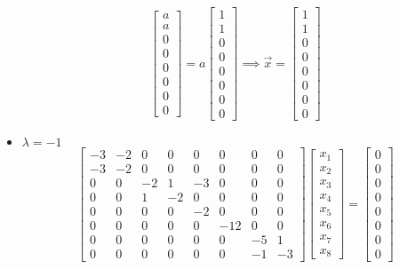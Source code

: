 \documentclass{report}
\begin{document}
\begin{itemize}
$$
\begin{bmatrix}
a \\ a \\ 0 \\ 0 \\ 0 \\ 0 \\ 0 \\ 0
\end{bmatrix} =
a\begin{bmatrix}
1 \\ 1 \\ 0 \\ 0 \\ 0 \\ 0 \\ 0 \\ 0
\end{bmatrix} \implies
\vec{x} = \begin{bmatrix}
1 \\ 1 \\ 0 \\ 0 \\ 0 \\ 0 \\ 0 \\ 0
\end{bmatrix}
$$
\item $\lambda = -1$
$$
\begin{bmatrix}
-3&-2&0&0&0&0&0&0\\
-3&-2&0&0&0&0&0&0\\
0&0&-2&1&-3&0&0&0\\
0&0&1&-2&0&0&0&0\\
0&0&0&0&-2&0&0&0\\
0&0&0&0&0&-12&0&0\\
0&0&0&0&0&0&-5&1\\
0&0&0&0&0&0&-1&-3
\end{bmatrix}
\begin{bmatrix}
x_1 \\ x_2 \\ x_3 \\ x_4 \\ x_5 \\ x_6 \\ x_7 \\ x_8
\end{bmatrix} = \begin{bmatrix}
0 \\ 0 \\ 0 \\ 0 \\ 0 \\ 0 \\ 0 \\ 0

\end{bmatrix}$$
\end{itemize}
\end{document}
